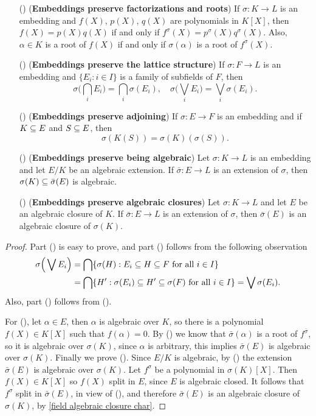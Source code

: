 \begin{proposition}\label{field embedding prop}
\mbox{}
\begin{itemize}
\item[(\rmnum{1})] (\textbf{Embeddings preserve factorizations and roots}) If $\sigma:K\to L$ is an embedding and $f(X)$, $p(X)$, $q(X)$ are polynomials in $K[X]$, then $f(X)=p(X)q(X)$ if and only if $f^\sigma(X)=p^\sigma(X)q^\sigma(X)$. Also, $\alpha\in K$ is a root of $f(X)$ if and only if $\sigma(\alpha)$ is a root of $f^\sigma(X)$.
\item[(\rmnum{2})] (\textbf{Embeddings preserve the lattice structure}) If $\sigma:F\to L$ is an embedding and $\{E_i:i\in I\}$ is a family of subfields of $F$, then
\[\sigma\Big(\bigcap_iE_i\Big)=\bigcap_i\sigma(E_i),\quad \sigma\Big(\bigvee_i E_i\Big)=\bigvee_i\sigma(E_i).\] 
\item[(\rmnum{3})] (\textbf{Embeddings preserve adjoining}) If $\sigma:E\to F$ is an embedding and if $K\subseteq E$ and $S\subseteq E$, then
\[\sigma(K(S))=\sigma(K)(\sigma(S)).\] 
\item[(\rmnum{4})] (\textbf{Embeddings preserve being algebraic}) Let $\sigma:K\to L$ is an embedding and let $E/K$ be an algebraic extension. If $\bar{\sigma}:E\to L$ is an extension of $\sigma$, then $\sigma(K)\subseteq\bar{\sigma}(E)$ is algebraic.
\item[(\rmnum{5})] (\textbf{Embeddings preserve algebraic closures}) Let $\sigma:K\to L$ and let $E$ be an algebraic closure of $K$. If $\bar{\sigma}:E\to L$ is an extension of $\sigma$, then $\bar{\sigma}(E)$ is an algebraic closure of $\sigma(K)$.  
\end{itemize}
\end{proposition}
\begin{proof}
Part () is easy to prove, and part () follows from the following observation
\begin{align*}
\sigma\Big(\bigvee E_i\Big)&=\bigcap\{\sigma(H):E_i\subseteq H\subseteq F\text{ for all $i\in I$}\}\\
&=\bigcap\{H':\sigma(E_i)\subseteq H'\subseteq\sigma(F)\text{ for all $i\in I$}\}=\bigvee\sigma(E_i).
\end{align*}
Also, part () follows from ().\par
For (), let $\alpha\in E$, then $\alpha$ is algebraic over $K$, so there is a polynomial $f(X)\in K[X]$ such that $f(\alpha)=0$. By () we know that $\bar{\sigma}(\alpha)$ is a root of $f^{\bar{\sigma}}$, so it is algebraic over $\sigma(K)$, since $\alpha$ is arbitrary, this implies $\bar{\sigma}(E)$ is algebraic over $\sigma(K)$. Finally we prove (). Since $E/K$ is algebraic, by () the extension $\bar{\sigma}(E)$ is algebraic over $\sigma(K)$. Let $f^\sigma$ be a polynomial in $\sigma(K)[X]$. Then $f(X)\in K[X]$ so $f(X)$ split in $E$, since $E$ is algebraic closed. It follows that $f^\sigma$ split in $\bar{\sigma}(E)$, in view of (), and therefore $\bar{\sigma}(E)$ is an algebraic closure of $\sigma(K)$, by \cref{field algebraic closure char}. 
\end{proof}
